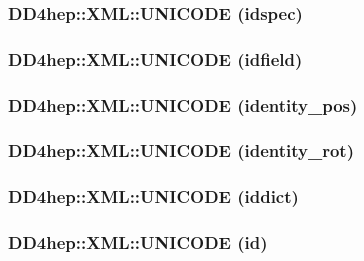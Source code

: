 \hypertarget{namespace_d_d4hep_1_1_x_m_l_a153be9698d96d7be3a2d022a5c89c534}{
\subsubsection[{UNICODE}]{\setlength{\rightskip}{0pt plus 5cm}DD4hep::XML::UNICODE (idspec)}}
\label{namespace_d_d4hep_1_1_x_m_l_a153be9698d96d7be3a2d022a5c89c534}
\hypertarget{namespace_d_d4hep_1_1_x_m_l_a322a908d2d64b76ba8c3fca928008e94}{
\subsubsection[{UNICODE}]{\setlength{\rightskip}{0pt plus 5cm}DD4hep::XML::UNICODE (idfield)}}
\label{namespace_d_d4hep_1_1_x_m_l_a322a908d2d64b76ba8c3fca928008e94}
\hypertarget{namespace_d_d4hep_1_1_x_m_l_abe0ea758871a8a326da3ec46761cb5d5}{
\subsubsection[{UNICODE}]{\setlength{\rightskip}{0pt plus 5cm}DD4hep::XML::UNICODE (identity\_\-pos)}}
\label{namespace_d_d4hep_1_1_x_m_l_abe0ea758871a8a326da3ec46761cb5d5}
\hypertarget{namespace_d_d4hep_1_1_x_m_l_aa0d82439cb124dc88a08a2d1bbe4e7b2}{
\subsubsection[{UNICODE}]{\setlength{\rightskip}{0pt plus 5cm}DD4hep::XML::UNICODE (identity\_\-rot)}}
\label{namespace_d_d4hep_1_1_x_m_l_aa0d82439cb124dc88a08a2d1bbe4e7b2}
\hypertarget{namespace_d_d4hep_1_1_x_m_l_afc478bc85e421d1b40bdffe4b0c2962d}{
\subsubsection[{UNICODE}]{\setlength{\rightskip}{0pt plus 5cm}DD4hep::XML::UNICODE (iddict)}}
\label{namespace_d_d4hep_1_1_x_m_l_afc478bc85e421d1b40bdffe4b0c2962d}
\hypertarget{namespace_d_d4hep_1_1_x_m_l_a04057694ceabef8f268fa221c04f7b01}{
\subsubsection[{UNICODE}]{\setlength{\rightskip}{0pt plus 5cm}DD4hep::XML::UNICODE (id)}}
